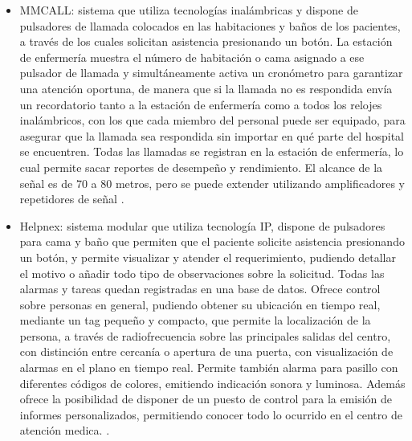 \begin{itemize}
\item MMCALL: sistema que utiliza tecnologías inalámbricas y dispone de pulsadores de llamada colocados en las habitaciones y baños de los pacientes, a través de los cuales solicitan asistencia presionando un botón. La estación de enfermería muestra el número de habitación o cama asignado a ese pulsador de llamada y simultáneamente activa un cronómetro para garantizar una atención oportuna, de manera que si la llamada no es respondida envía un recordatorio tanto a la estación de enfermería como a todos los relojes inalámbricos, con los que cada miembro del personal puede ser equipado, para asegurar que la llamada sea respondida sin importar en qué parte del hospital se encuentren. Todas las llamadas se registran en la estación de enfermería, lo cual permite sacar reportes de desempeño y rendimiento. El alcance de la señal es de 70 a 80 metros, pero se puede extender utilizando amplificadores y repetidores de señal \cite{mmcall}.	

\item Helpnex: sistema modular que utiliza tecnología IP, dispone de pulsadores para cama y baño que permiten que el paciente solicite asistencia presionando un botón, y permite visualizar y atender el requerimiento, pudiendo detallar el motivo o añadir todo tipo de observaciones sobre la solicitud. Todas las alarmas y tareas quedan registradas en una base de datos. Ofrece control sobre personas en general, pudiendo obtener su ubicación en tiempo real, mediante un tag pequeño y compacto, que permite la localización de la persona, a través de radiofrecuencia sobre las principales salidas del centro, con distinción entre cercanía o apertura de una puerta, con visualización de alarmas en el plano en tiempo real. Permite también alarma para pasillo con diferentes códigos de colores, emitiendo indicación sonora y luminosa. Además ofrece la posibilidad de disponer de un puesto de control para la emisión de informes personalizados, permitiendo conocer todo lo ocurrido en el centro de atención medica. \cite{helpnex}.


\end{itemize}
